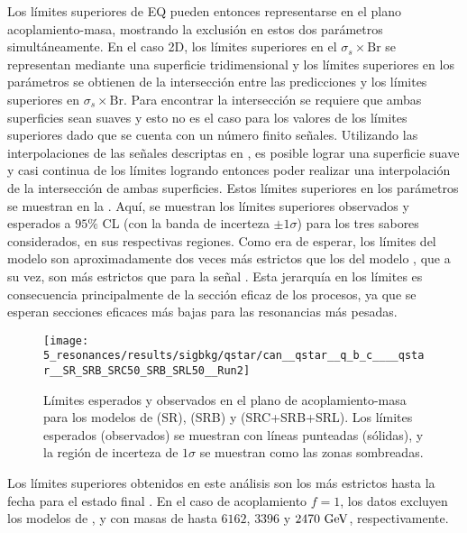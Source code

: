 Los límites superiores de \ac{EQ} pueden entonces representarse en el plano acoplamiento-masa, mostrando la exclusión en estos dos parámetros simultáneamente.
En el caso 2D, los límites superiores en el \(\sigma_s \times \text{Br}\) se representan mediante una superficie tridimensional y los límites superiores en los parámetros se obtienen de la intersección entre las predicciones y los límites superiores en \(\sigma_s \times \text{Br}\). Para encontrar la intersección se requiere que ambas superficies sean suaves y esto no es el caso para los valores de los límites superiores dado que se cuenta con un número finito señales. Utilizando las interpolaciones de las señales descriptas en \Sect{\ref{sec:signals:modeling}}, es posible lograr una superficie suave y casi continua de los límites logrando entonces poder realizar una interpolación de la intersección de ambas superficies. Estos límites superiores en los parámetros se muestran en la \Fig{\ref{fig:results:results:bkgsig:results:qstar:limits_2d}}. Aquí, se muestran los límites superiores observados y esperados a \(95\%\) \ac{CL} (con la banda de incerteza \(\pm 1 \sigma\)) para los tres sabores considerados, en sus respectivas regiones. Como era de esperar, los límites del modelo \qstar son aproximadamente dos veces más estrictos que los del modelo \cstar, que a su vez, son más estrictos que para la señal \bstar. Esta jerarquía en los límites es consecuencia principalmente de la sección eficaz de los procesos, ya que se esperan secciones eficaces más bajas para las resonancias más pesadas.

\begin{figure}[ht!]
    \centering
    \texttt{[image: 5\_resonances/results/sigbkg/qstar/can\_\_qstar\_\_q\_b\_c\_\_\_\_qstar\_\_SR\_SRB\_SRC50\_SRB\_SRL50\_\_Run2]}
    \caption{Límites esperados y observados en el plano de acoplamiento-masa para los modelos de \qstar (SR), \bstar (SRB) y \cstar (SRC+SRB+SRL). Los límites esperados (observados) se muestran con líneas punteadas (sólidas), y la región de incerteza de \(1\sigma\) se muestran como las zonas sombreadas.}
    \label{fig:results:results:bkgsig:results:qstar:limits_2d}
\end{figure}

Los límites superiores obtenidos en este análisis son los más estrictos hasta la fecha para el estado final \gammajet. En el caso de acoplamiento \(f=1\), los datos excluyen los modelos de \qstar, \cstar y \bstar con masas de hasta \(6162\), \(3396\) y \(2470~\text{GeV}\), respectivamente.



